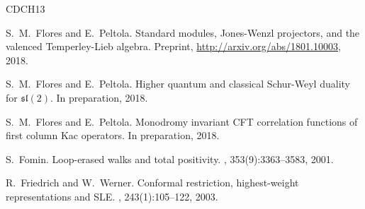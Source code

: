 \documentclass[oneside,english]{amsart}
\numberwithin{equation}{section}
\numberwithin{figure}{section}
\theoremstyle{plain}
\theoremstyle{plain}
\theoremstyle{plain}
\theoremstyle{remark}
\theoremstyle{plain}
\theoremstyle{plain}
\theoremstyle{plain}
\theoremstyle{plain}
\theoremstyle{plain}
\theoremstyle{plain}
\theoremstyle{plain}
\theoremstyle{plain}
\begin{document}
\begin{thebibliography}{CDCH{\etalchar{+}}13}

S.~M.~Flores and E.~Peltola.
\newblock Standard modules, Jones-Wenzl projectors, and the valenced Temperley-Lieb algebra.
\newblock Preprint, \url{http://arxiv.org/abs/1801.10003}, 2018.

S.~M.~Flores and E.~Peltola.
\newblock Higher quantum and classical {S}chur-{W}eyl duality for {$\mathfrak{sl}(2)$}.
\newblock In preparation, 2018.

S.~M.~Flores and E.~Peltola.
\newblock Monodromy invariant {CFT} correlation functions of first column {K}ac operators.
\newblock In preparation, 2018.


S.~Fomin.
\newblock Loop-erased walks and total positivity.
, 353(9):3363--3583, 2001.

R.~Friedrich and W.~Werner.
\newblock Conformal restriction, highest-weight representations and SLE.
, 243(1):105--122, 2003.

 



\end{thebibliography}
\end{document}
